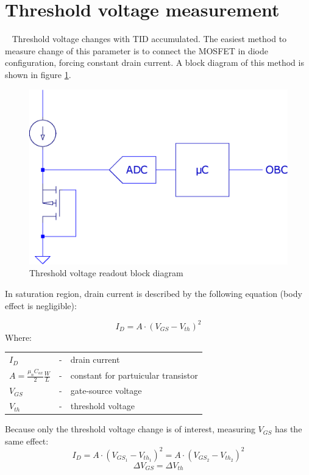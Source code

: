 \section{Threshold voltage measurement}
    Threshold voltage changes with TID accumulated. The easiest method to measure change of this parameter is to connect the MOSFET in diode configuration, forcing constant drain current. A block diagram of this method is shown in figure \ref{Vth_readout_block_diagram}.

    \begin{figure}[H]
        \centering
        \includegraphics[width=0.3\paperwidth]{img/05/conceptual_block_diagram.eps}
        \caption{Threshold voltage readout block diagram}
        \label{Vth_readout_block_diagram}
    \end{figure}

    In saturation region, drain current is described by the following equation (body effect is negligible):

    $$I_D = A \cdot (V_{GS} - V_{th})^2$$
    Where:

    \begin{tabular}{lcl}
        $I_D$ & - & drain current \\
        $A = \frac{\mu_n C_{ox}}{2} \frac{W}{L}$ & - & constant for partuicular transistor \\
        $V_{GS}$ & - & gate-source voltage \\
        $V_{th}$ & - & threshold voltage \\
    \end{tabular}
    \bigskip

    Because only the threshold voltage change is of interest, measuring $V_{GS}$ has the same effect:
    $$I_D = A \cdot (V_{GS_1} - V_{th_1})^2 = A \cdot (V_{GS_2} - V_{th_2})^2$$
    $$\Delta V_{GS} = \Delta V_{th}$$

